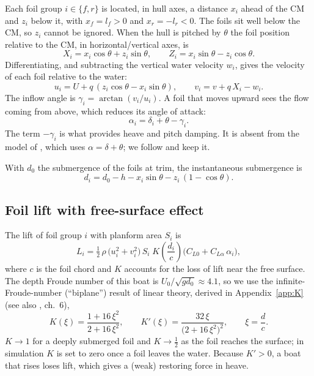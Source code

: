 \documentclass[11pt,a4paper]{article}
\newcommand{\half}{\tfrac{1}{2}}
\begin{document}
Each foil group $i\in\{f,r\}$ is located, in hull axes, a distance $x_i$ ahead of
the CM and $z_i$ below it, with $x_f=l_f>0$ and $x_r=-l_r<0$. The foils sit well
below the CM, so $z_i$ cannot be ignored. When the hull is pitched by $\theta$ the
foil position relative to the CM, in horizontal/vertical axes, is
\begin{equation}
X_i = x_i\cos\theta + z_i\sin\theta, \qquad
Z_i = x_i\sin\theta - z_i\cos\theta .
\label{eq:pos}
\end{equation}
Differentiating, and subtracting the vertical water velocity $w_i$, gives the
velocity of each foil relative to the water:
\begin{equation}
u_i = U + q\,(z_i\cos\theta - x_i\sin\theta), \qquad
v_i = v + q\,X_i - w_i .
\label{eq:vfoil}
\end{equation}
The inflow angle is $\gamma_i=\arctan(v_i/u_i)$. A foil that moves upward sees the
flow coming from above, which reduces its angle of attack:
\begin{equation}
\alpha_i = \delta_i + \theta - \gamma_i .
\label{eq:alpha}
\end{equation}
The term $-\gamma_i$ is what provides heave and pitch damping. It is absent from
the model of \cite{belime}, which uses $\alpha=\delta+\theta$; we follow
\cite{renyang,liu} and keep it.

With $d_0$ the submergence of the foils at trim, the instantaneous submergence is
\begin{equation}
d_i = d_0 - h - x_i\sin\theta - z_i\,(1-\cos\theta) .
\label{eq:depth}
\end{equation}

\subsection{Foil lift with free-surface effect}

The lift of foil group $i$ with planform area $S_i$ is
\begin{equation}
L_i = \half\,\rho\,\bigl(u_i^2+v_i^2\bigr)\,S_i\;K\!\left(\frac{d_i}{c}\right)
      \bigl(C_{L0}+C_{L\alpha}\,\alpha_i\bigr),
\label{eq:lift}
\end{equation}
where $c$ is the foil chord and $K$ accounts for the loss of lift near the free
surface. The depth Froude number of this boat is $U_0/\sqrt{g d_0}\approx4.1$,
so we use the infinite-Froude-number (``biplane'') result of linear theory, derived in
Appendix~\ref{app:K} (see also \cite{faltinsen}, ch.~6),
\begin{equation}
K(\xi)=\frac{1+16\,\xi^{2}}{2+16\,\xi^{2}}, \qquad
K'(\xi)=\frac{32\,\xi}{\bigl(2+16\,\xi^{2}\bigr)^{2}}, \qquad \xi=\frac{d}{c}.
\label{eq:K}
\end{equation}
$K\to1$ for a deeply submerged foil and $K\to\half$ as the foil reaches the
surface; in simulation $K$ is set to zero once a foil leaves the water. Because $K'>0$, a boat that rises loses lift, which gives a (weak)
restoring force in heave.
\end{document}
